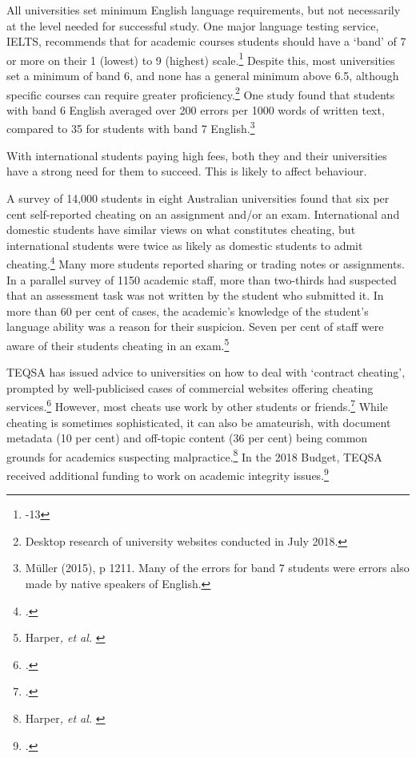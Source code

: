 \documentclass{grattan}
\begin{document}
All universities set minimum English language requirements, but not necessarily at the level needed for successful study. One major language testing service, IELTS, recommends that for academic courses students should have a `band' of 7 or more on their 1 (lowest) to 9 (highest) scale.\footnote{\textcite[][12]{IELTS2018guideforeducation}-13} Despite this, most universities set a minimum of band 6, and none has a general minimum above 6.5, although specific courses can require greater proficiency.\footnote{Desktop research of university websites conducted in July 2018.} One study found that students with band 6 English averaged over 200 errors per 1000 words of written text, compared to 35 for students with band 7 English.\footnote{Müller (2015), p 1211. Many of the errors for band 7 students were errors also made by native speakers of English.}

With international students paying high fees, both they and their universities have a strong need for them to succeed. This is likely to affect behaviour.

A survey of 14,000 students in eight Australian universities found that six per cent self-reported cheating on an assignment and/or an exam. International and domestic students have similar views on what constitutes cheating, but international students were twice as likely as domestic students to admit cheating.\footcite[][]{Bretag2018contractcheating} Many more students reported sharing or trading notes or assignments. In a parallel survey of 1150 academic staff, more than two-thirds had suspected that an assessment task was not written by the student who submitted it. In more than 60 per cent of cases, the academic's knowledge of the student's language ability was a reason for their suspicion. Seven per cent of staff were aware of their students cheating in an exam.\footnote{Harper\emph{, et al.} \textcite[][]{Bretag2018contractcheating}}

TEQSA has issued advice to universities on how to deal with `contract cheating', prompted by well-publicised cases of commercial websites offering cheating services.\footcite[][]{TEQSA2017goodpracticenote} However, most cheats use work by other students or friends.\footcite[][]{Bretag2018contractcheating} While cheating is sometimes sophisticated, it can also be amateurish, with document metadata (10 per cent) and off-topic content (36 per cent) being common grounds for academics suspecting malpractice.\footnote{Harper\emph{, et al.} \textcite[][]{Bretag2018contractcheating}} In the 2018 Budget, TEQSA received additional funding to work on academic integrity issues.\footcite[][]{TEQSA2018nationalregistero}
\end{document}
